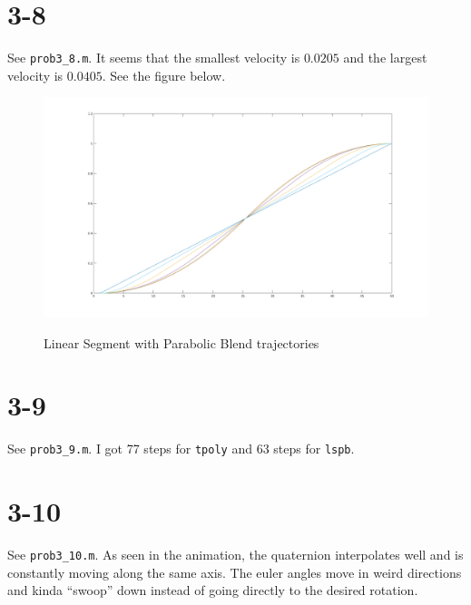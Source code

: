 \documentclass{../homework}
\begin{document}
\begin{parts}[n]
\begin{parts}
       \part{3-8} See \texttt{prob3\_8.m}. It seems that the smallest velocity is $0.0205$ and the largest velocity is $0.0405$. See the figure below.
       \begin{figure}[H]
            \centering
            \includegraphics[scale=.3]{3_8.png}
            \label{Traj}
            \caption{Linear Segment with Parabolic Blend trajectories}
       \end{figure}
       \part{3-9} See \texttt{prob3\_9.m}. I got 77 steps for \texttt{tpoly} and 63 steps for \texttt{lspb}.

       \part{3-10} See \texttt{prob3\_10.m}. As seen in the animation, the quaternion interpolates well and is constantly moving along the same axis. The euler angles move in weird directions and kinda ``swoop'' down instead of going directly to the desired rotation.


\end{parts}
\end{parts}
\end{document}

